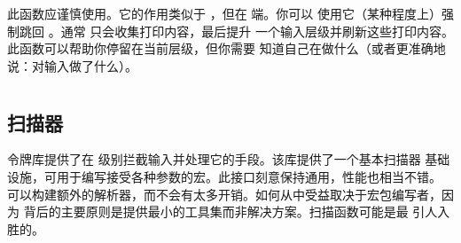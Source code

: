 
此函数应谨慎使用。它的作用类似于 ，但在 \LUA 端。你可以
使用它（某种程度上）强制跳回 \TEX。通常 \LUA 只会收集打印内容，最后提升
一个输入层级并刷新这些打印内容。此函数可以帮助你停留在当前层级，但你需要
知道自己在做什么（或者更准确地说：\TEX 对输入做了什么）。

\section{}

\subsection{扫描器}



令牌库提供了在 \LUA 级别拦截输入并处理它的手段。该库提供了一个基本扫描器
基础设施，可用于编写接受各种参数的宏。此接口刻意保持通用，性能也相当不错。
可以构建额外的解析器，而不会有太多开销。如何从中受益取决于宏包编写者，因为
\LUATEX 背后的主要原则是提供最小的工具集而非解决方案。扫描函数可能是最
引人入胜的。

